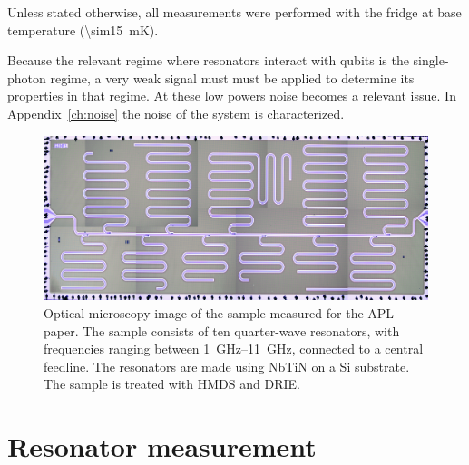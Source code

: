     Unless stated otherwise, all measurements were performed with the fridge at base temperature (\SI{\sim15}{\milli \kelvin}).

    Because the relevant regime where resonators interact with qubits is the single-photon regime, a very weak signal must must be applied to determine its properties in that regime. At these low powers noise becomes a relevant issue. In Appendix~\ref{ch:noise} the noise of the system is characterized.

    \begin{figure}[h]
      \centering
      \includegraphics[width=.7\textwidth]{Figures/DRIE/All_set4.png}
      \caption{Optical microscopy image of the sample measured for the APL paper. The sample consists of ten quarter-wave resonators, with frequencies ranging between \SIrange{1}{11}{\giga \hertz}, connected to a central feedline. The resonators are made using NbTiN on a Si substrate. The sample is treated with HMDS and DRIE.}
        \label{fig:set4}
    \end{figure}



\section{Resonator measurement}

